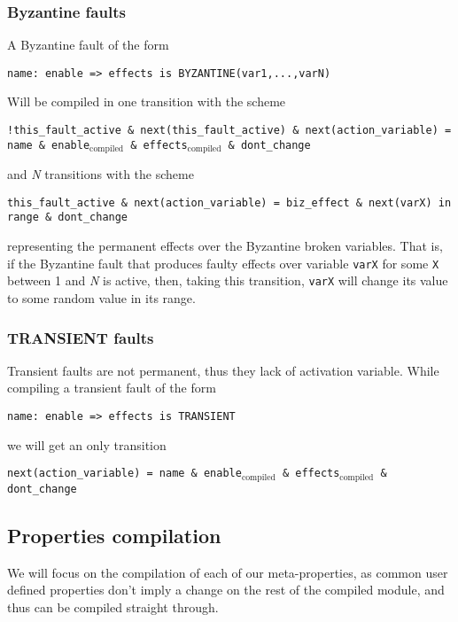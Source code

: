 \documentclass[12pt]{article}
\newcommand{\textusc}[1]{$_{\text{#1}}$} %
\begin{document}
\subsubsection*{Byzantine faults}
A Byzantine fault of the form
\begin{center}
\texttt{name: enable => effects is BYZANTINE(var1,...,varN)}
\end{center}
Will be compiled in one transition with the scheme
\begin{center}
\texttt{!this\_fault\_active \& next(this\_fault\_active) \& next(action\_variable) = name \& enable\textusc{compiled} \& effects\textusc{compiled} \& dont\_change}
\end{center}
and \textit{N} transitions with the scheme
\begin{center}
\texttt{this\_fault\_active \& next(action\_variable) = biz\_effect \& next(varX) in range \& dont\_change}
\end{center}
representing the permanent effects over the Byzantine broken variables. That is, if the Byzantine fault that produces faulty effects over variable \texttt{varX} for some \texttt{X} between 1 and \textit{N} is active, then, taking this transition, \texttt{varX} will change its value to some random value in its range.

\subsubsection*{TRANSIENT faults}
Transient faults are not permanent, thus they lack of activation variable. While compiling a transient fault of the form
\begin{center}
\texttt{name: enable => effects is TRANSIENT}
\end{center}
we will get an only transition
\begin{center}
\texttt{next(action\_variable) = name \& enable\textusc{compiled} \& effects\textusc{compiled} \& dont\_change}
\end{center}


\subsection{Properties compilation}
We will focus on the compilation of each of our meta-properties, as common user defined properties don't imply a change on the rest of the compiled module, and thus can be compiled straight through.
\end{document}
